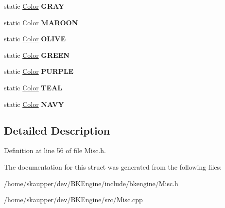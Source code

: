 \begin{DoxyCompactItemize}
\item 
\mbox{\label{structbkengine_1_1Color_a6cba9bfb74c16863201155f01da97461}} 
static \hyperlink{structbkengine_1_1Color}{Color} {\bfseries G\+R\+AY}
\item 
\mbox{\label{structbkengine_1_1Color_a3f0f92edddf69f742cf4751e91276bcd}} 
static \hyperlink{structbkengine_1_1Color}{Color} {\bfseries M\+A\+R\+O\+ON}
\item 
\mbox{\label{structbkengine_1_1Color_a84035523724f908034a9e3e893058bfb}} 
static \hyperlink{structbkengine_1_1Color}{Color} {\bfseries O\+L\+I\+VE}
\item 
\mbox{\label{structbkengine_1_1Color_a5b9aafb544d41992e367b065e6595143}} 
static \hyperlink{structbkengine_1_1Color}{Color} {\bfseries G\+R\+E\+EN}
\item 
\mbox{\label{structbkengine_1_1Color_a130287f8f4e91c9c567ea0cc27f5f012}} 
static \hyperlink{structbkengine_1_1Color}{Color} {\bfseries P\+U\+R\+P\+LE}
\item 
\mbox{\label{structbkengine_1_1Color_a9853aa37a061c26fe3544489f2c93869}} 
static \hyperlink{structbkengine_1_1Color}{Color} {\bfseries T\+E\+AL}
\item 
\mbox{\label{structbkengine_1_1Color_abf2353c34e494cbfc1176f915112be8e}} 
static \hyperlink{structbkengine_1_1Color}{Color} {\bfseries N\+A\+VY}
\end{DoxyCompactItemize}


\subsection{Detailed Description}


Definition at line 56 of file Misc.\+h.



The documentation for this struct was generated from the following files\+:\begin{DoxyCompactItemize}
\item 
/home/skaupper/dev/\+B\+K\+Engine/include/bkengine/Misc.\+h\item 
/home/skaupper/dev/\+B\+K\+Engine/src/Misc.\+cpp\end{DoxyCompactItemize}
